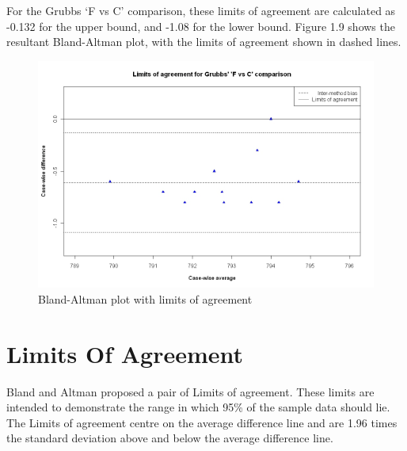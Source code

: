 \documentclass[12pt, a4paper]{report}
\theoremstyle{plain}
\theoremstyle{definition}
\theoremstyle{remark}
\begin{document}
	
	
	For the Grubbs `F vs C' comparison, these limits
	of agreement are calculated as -0.132 for the upper bound, and
	-1.08 for the lower bound. Figure 1.9 shows the resultant
	Bland-Altman plot, with the limits of agreement shown in dashed
	lines.
	
	
	\begin{figure}[h!]
		\begin{center}
			\includegraphics[width=125mm]{images/GrubbsBAplot-LOA.jpeg}
			\caption{Bland-Altman plot with limits of agreement}\label{GrubbsBAplot-noLOA}
		\end{center}
	\end{figure}

	

	\section{Limits Of Agreement}
	Bland and Altman proposed a pair of Limits of agreement. These
	limits are intended to demonstrate the range in which 95\% of the
	sample data should lie. The Limits of agreement centre on the
	average difference line and are 1.96 times the standard deviation
	above and below the average difference line.
	
\end{document}

